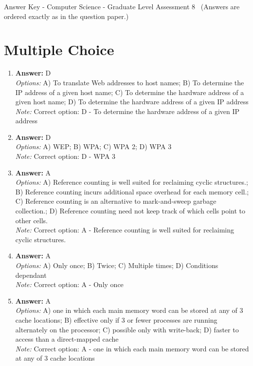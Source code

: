 \documentclass[12pt]{article}
\begin{document}
\begin{center}
Answer Key - Computer Science - Graduate Level Assessment 8 \
\small (Answers are ordered exactly as in the question paper.)
\end{center}

\section*{Multiple Choice}
\begin{enumerate}[label=\arabic*.]
\item \textbf{Answer:} D
\\ \textit{Options:} A) To translate Web addresses to host names; B) To determine the IP address of a given host name; C) To determine the hardware address of a given host name; D) To determine the hardware address of a given IP address
\\ \textit{Note:} Correct option: D - To determine the hardware address of a given IP address
\item \textbf{Answer:} D
\\ \textit{Options:} A) WEP; B) WPA; C) WPA 2; D) WPA 3
\\ \textit{Note:} Correct option: D - WPA 3
\item \textbf{Answer:} A
\\ \textit{Options:} A) Reference counting is well suited for reclaiming cyclic structures.; B) Reference counting incurs additional space overhead for each memory cell.; C) Reference counting is an alternative to mark-and-sweep garbage collection.; D) Reference counting need not keep track of which cells point to other cells.
\\ \textit{Note:} Correct option: A - Reference counting is well suited for reclaiming cyclic structures.
\item \textbf{Answer:} A
\\ \textit{Options:} A) Only once; B) Twice; C) Multiple times; D) Conditions dependant
\\ \textit{Note:} Correct option: A - Only once
\item \textbf{Answer:} A
\\ \textit{Options:} A) one in which each main memory word can be stored at any of 3 cache locations; B) effective only if 3 or fewer processes are running alternately on the processor; C) possible only with write-back; D) faster to access than a direct-mapped cache
\\ \textit{Note:} Correct option: A - one in which each main memory word can be stored at any of 3 cache locations
\end{enumerate}
\end{document}
